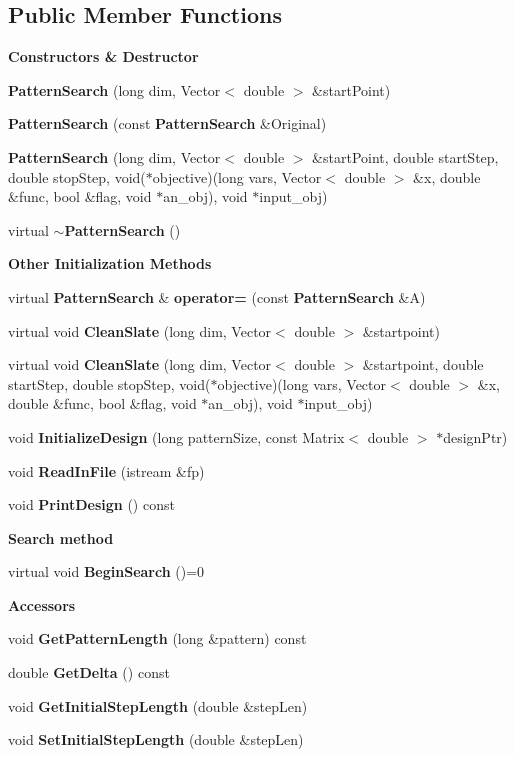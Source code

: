 \subsection*{Public Member Functions}
\begin{Indent}{\bf Constructors \& Destructor}\par
\begin{CompactItemize}
\item 
{\bf Pattern\-Search} (long dim, Vector$<$ double $>$ \&start\-Point)
\item 
{\bf Pattern\-Search} (const {\bf Pattern\-Search} \&Original)
\item 
{\bf Pattern\-Search} (long dim, Vector$<$ double $>$ \&start\-Point, double start\-Step, double stop\-Step, void($\ast$objective)(long vars, Vector$<$ double $>$ \&x, double \&func, bool \&flag, void $\ast$an\_\-obj), void $\ast$input\_\-obj)
\item 
virtual {\bf $\sim$Pattern\-Search} ()
\end{CompactItemize}
\end{Indent}
\begin{Indent}{\bf Other Initialization Methods}\par
\begin{CompactItemize}
\item 
virtual {\bf Pattern\-Search} \& {\bf operator=} (const {\bf Pattern\-Search} \&A)
\item 
virtual void {\bf Clean\-Slate} (long dim, Vector$<$ double $>$ \&startpoint)
\item 
virtual void {\bf Clean\-Slate} (long dim, Vector$<$ double $>$ \&startpoint, double start\-Step, double stop\-Step, void($\ast$objective)(long vars, Vector$<$ double $>$ \&x, double \&func, bool \&flag, void $\ast$an\_\-obj), void $\ast$input\_\-obj)
\item 
void {\bf Initialize\-Design} (long pattern\-Size, const Matrix$<$ double $>$ $\ast$design\-Ptr)
\item 
void {\bf Read\-In\-File} (istream \&fp)
\item 
void {\bf Print\-Design} () const 
\end{CompactItemize}
\end{Indent}
\begin{Indent}{\bf Search method}\par
\begin{CompactItemize}
\item 
virtual void {\bf Begin\-Search} ()=0
\end{CompactItemize}
\end{Indent}
\begin{Indent}{\bf Accessors}\par
\begin{CompactItemize}
\item 
void {\bf Get\-Pattern\-Length} (long \&pattern) const 
\item 
double {\bf Get\-Delta} () const 
\item 
void {\bf Get\-Initial\-Step\-Length} (double \&step\-Len)
\item 
void {\bf Set\-Initial\-Step\-Length} (double \&step\-Len)
\end{CompactItemize}
\end{Indent}
